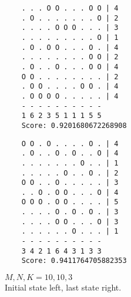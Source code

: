 \begin{figure}[h!]
\begin{multicols}{2}
    \begin{verbatim}
    . . . O O . . . O O | 4
    . O . . . . . . . O | 2
    . . . . O O O . . . | 3
    . . . . . . . . . O | 1
    . O . O O . . . O . | 4
    . . . . . . . . O O | 2
    . O . . O . . . O O | 4
    O O . . . . . . . . | 2
    . O O . . . . O O . | 4
    . O O O O . . . . . | 4
    - - - - - - - - - -
    1 6 2 3 5 1 1 1 5 5
    Score: 0.9201680672268908
    \end{verbatim}
    \columnbreak
    \begin{verbatim}
    O O . O . . . . O . | 4
    . O . . O . O . . O | 4
    . . . . . . . O . . | 1
    . . . . . O . . O . | 2
    O O . . O . . . . . | 3
    . . O . O O . . . O | 4
    O O O . O O . . . . | 5
    . . . . O . O . O . | 3
    . . . . O O . . . O | 3
    . . . . . . O . . . | 1
    - - - - - - - - - -
    3 4 2 1 6 4 3 1 3 3
    Score: 0.9411764705882353
    \end{verbatim}
    \end{multicols}
\caption{$M, N, K = 10, 10, 3$\\
Initial state left, last state right.}
\end{figure}
